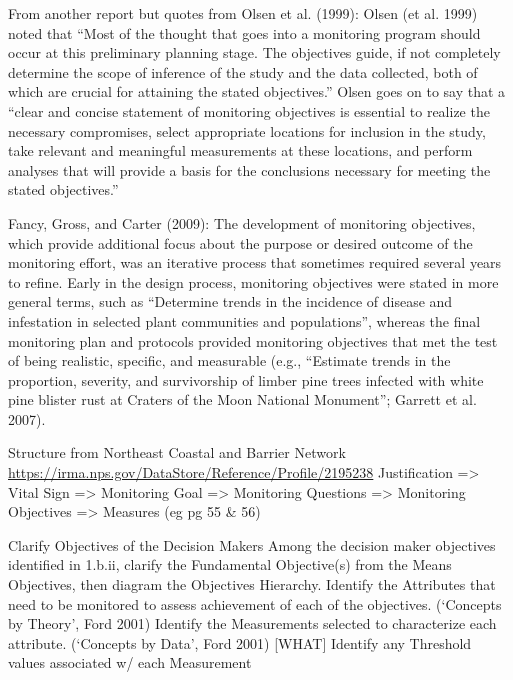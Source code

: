 \documentclass[]{article}
\begin{document}
From another report but quotes from Olsen et al. (1999): Olsen (et al.
1999) noted that ``Most of the thought that goes into a monitoring
program should occur at this preliminary planning stage. The objectives
guide, if not completely determine the scope of inference of the study
and the data collected, both of which are crucial for attaining the
stated objectives.'' Olsen goes on to say that a ``clear and concise
statement of monitoring objectives is essential to realize the necessary
compromises, select appropriate locations for inclusion in the study,
take relevant and meaningful measurements at these locations, and
perform analyses that will provide a basis for the conclusions necessary
for meeting the stated objectives.''

Fancy, Gross, and Carter (2009): The development of monitoring
objectives, which provide additional focus about the purpose or desired
outcome of the monitoring effort, was an iterative process that
sometimes required several years to refine. Early in the design process,
monitoring objectives were stated in more general terms, such as
``Determine trends in the incidence of disease and infestation in
selected plant communities and populations'', whereas the final
monitoring plan and protocols provided monitoring objectives that met
the test of being realistic, specific, and measurable (e.g., ``Estimate
trends in the proportion, severity, and survivorship of limber pine
trees infected with white pine blister rust at Craters of the Moon
National Monument''; Garrett et al. 2007).

Structure from Northeast Coastal and Barrier Network
\url{https://irma.nps.gov/DataStore/Reference/Profile/2195238}
Justification =\textgreater{} Vital Sign =\textgreater{} Monitoring Goal
=\textgreater{} Monitoring Questions =\textgreater{} Monitoring
Objectives =\textgreater{} Measures (eg pg 55 \& 56)

Clarify Objectives of the Decision Makers Among the decision maker
objectives identified in 1.b.ii, clarify the Fundamental Objective(s)
from the Means Objectives, then diagram the Objectives Hierarchy.
Identify the Attributes that need to be monitored to assess achievement
of each of the objectives. (`Concepts by Theory', Ford 2001) Identify
the Measurements selected to characterize each attribute. (`Concepts by
Data', Ford 2001) {[}WHAT{]} Identify any Threshold values associated w/
each Measurement
\end{document}
